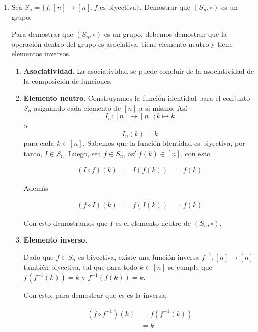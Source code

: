 \documentclass{report}
\begin{document}
    \pagebreak

    \begin{enumerate}
        \item Sea $S_n = \{ f : \left[ n \right] \to \left[ n \right] : f \text{ es biyectiva} \}$. Demostrar que $(S_n, \circ)$ es un grupo.
        
        Para demostrar que $(S_n, \circ)$ es un grupo, debemos demostrar que la operación dentro del grupo es asociativa, tiene elemento neutro y tiene elementos inversos.

        \begin{enumerate}
            \item \textbf{Asociatividad}. La asociatividad se puede concluir de la asociatividad de la composición de funciones.
            \item \textbf{Elemento neutro}. Construyamos la función identidad para el conjunto $S_n$ asignando cada elemento de $\left[ n \right]$ a si mismo. Así
            $$ I_n : \left[ n \right] \to \left[ n \right] ; k \mapsto k $$ o $$ I_n(k) = k$$ para cada $k \in [n]$. Sabemos que la función identidad es biyectiva, por tanto, $I \in S_n$.
            Luego, sea $f \in S_n$, así $f(k) \in [n]$, con esto

            \begin{align*}
                (I \circ f)(k)  &= I(f(k))
                &= f(k)
            \end{align*}

            Además

            \begin{align*}
                (f \circ I)(k)  &= f(I(k))
                &= f(k)
            \end{align*}

            Con esto demostramos que $I$ es el elemento neutro de $(S_n, \circ)$.

            \item \textbf{Elemento inverso}.

            Dado que $f \in S_n$ es biyectiva, existe una función inversa $f^{-1} : [n] \to [n]$ también biyectiva, tal que para todo $k \in [n]$ se cumple que $f(f^{-1}(k)) = k$ y $f^{-1}(f(k)) = k$.

            Con esto, para demostrar que es es la inversa,

            \begin{align*}
            (f \circ f^{-1})(k) &= f(f^{-1}(k)) \\
            &= k
            \end{align*}


\end{enumerate}
\end{enumerate}
\end{document}
